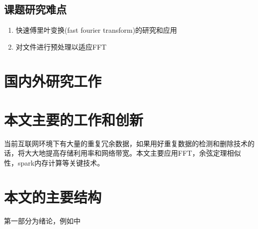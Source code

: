 \subsection{课题研究难点}
\label{sec:point2}

\begin{enumerate}
\item 快速傅里叶变换(fast fourier transform)的研究和应用

\item 对文件进行预处理以适应FFT

\end{enumerate}

\section{国内外研究工作}
\label{sec:relatedwork}

\section{本文主要的工作和创新}
\label{sec:relatedwork}

当前互联网环境下有大量的重复冗余数据，如果用好重复数据的检测和删除技术的话，将大大地提高存储利用率和网络带宽。本文主要应用FFT，余弦定理相似性，spark内存计算等关键技术。

\section{本文的主要结构}
\label{sec:cons}

第一部分为绪论，例如\cite{denehy2003duplicate}中
